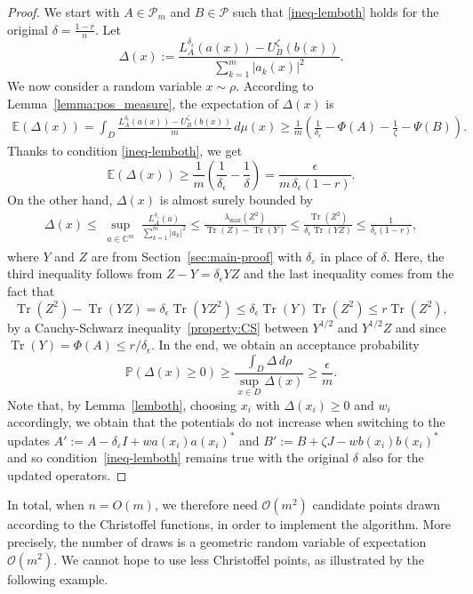 \documentclass[a4paper,11pt]{article}
\renewcommand{\(}{\left (}
\renewcommand{\)}{\right )}
\newcommand{\<}{\langle}
\renewcommand{\>}{\rangle}
\newcommand{\eps}{\varepsilon}
\newcommand{\C}{\mathbb{C}}
\newcommand{\E}{\mathbb{E}}
\theoremstyle{definition}
\DeclareMathOperator{\Tr}{Tr}
\begin{document}
\begin{proof}
We start with $A \in \mathcal P_m$ and $B\in \mathcal P$ such that \eqref{ineq-lemboth} holds for the original $\delta=\frac{1-r}{n}$.
Let
\[
\Delta(x):= \frac{L_A^{\delta_\epsilon}(a(x))- U_B^\zeta(b(x))}{\sum_{k=1}^m|a_k(x)|^2}.
\]
We now consider a random variable $x\sim \rho$.
According to Lemma~\ref{lemma:pos_measure},
the expectation of $\Delta(x)$ is 
\begin{align*}
\E(\Delta(x))
=\int_D \frac{L_A^{\delta_\epsilon}(a(x))-U_B^\zeta(b(x))}m \, d\mu(x)
\geq \frac{1}{m}\left(\frac{1}{\delta_\epsilon}-\Phi(A)- \frac{1}{\zeta}-\Psi(B)\right).
\end{align*}
Thanks to condition \eqref{ineq-lemboth}, 
we get
\[
\E(\Delta(x))
\geq \frac{1}{m}\left(\frac{1}{\delta_\epsilon}-\frac{1}{\delta}\right)=\frac{\epsilon}{m \,\delta_\epsilon(1-r)}.
\]
On the other hand, $\Delta(x)$ is almost surely bounded by
\begin{align*}
\Delta(x)
\leq \sup_{\substack{a\in\C^m 
}} \frac{L_A^{\delta_\eps}(a)}{\sum_{k=1}^m|a_k|^2} 
\leq \frac{\lambda_{\max}(Z^2)}{\Tr(Z)-\Tr(Y)}\leq  \frac{\Tr(Z^2)}{\delta_\epsilon\Tr(YZ)}\leq \frac{1}{\delta_\epsilon(1-r)},
\end{align*}
where $Y$ and $Z$ are from Section~\ref{sec:main-proof} with $\delta_\eps$ in place of $\delta$. Here,
the third inequality follows from $Z-Y=\delta_\epsilon YZ$
and the last inequality comes from the fact that
\[
\Tr(Z^2)-\Tr(YZ)=\delta_\epsilon \Tr(Y Z^2)\leq \delta_\epsilon\Tr(Y)\Tr(Z^2)\leq r\Tr(Z^2),
\]
by a Cauchy-Schwarz inequality~\eqref{property:CS} between $Y^{1/2}$ and $Y^{1/2}Z$ and
since $\Tr(Y)=\Phi(A)\leq r/\delta_\epsilon$. In the end, we obtain an acceptance probability
\[
\mathbb P(\Delta(x)\geq 0)
\geq \frac{\int_D \Delta\, d\rho}{\sup_{x\in D} \Delta(x)}\geq \frac{\epsilon}m.
\]
Note that, by Lemma~\ref{lemboth}, choosing $x_i$ with $\Delta(x_i) \ge 0$ and $w_i$ accordingly, we obtain that the potentials do not increase 
when switching to the updates 
$A':=A-\delta_\eps I+wa(x_i)a(x_i)^*$ and 
$ B':=B+\zeta J-wb(x_i)b(x_i)^*$ and
so 
condition~\eqref{ineq-lemboth} remains true with the original $\delta$ also for the updated operators.
\end{proof}

In total, when $n=O(m)$, we therefore need $\mathcal O(m^2)$ candidate points drawn according to the Christoffel functions, in order to implement the algorithm. More precisely, the number of draws is a geometric random variable of expectation $\mathcal O(m^2)$.
We cannot hope to use less Christoffel points, as illustrated by the following example.
\end{document}
